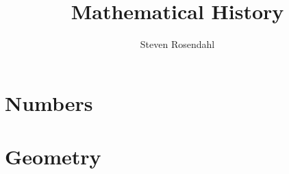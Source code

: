 \documentclass{book}
\author{Steven Rosendahl}
\title{Mathematical History}
\date{}
\begin{document}
    \maketitle

    
    

    \part{Numbers}
        
        
        

    \part{Geometry}
        
\end{document}
